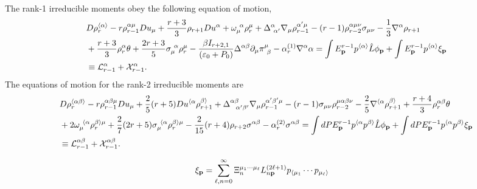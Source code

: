 \documentclass[aps,prd,preprint,nofootinbib,amsmath,amssymb,showpacs,longbibliography,singlecolumn,superscriptaddress,10pt]{revtex4-1}
\theoremstyle{plain}
\theoremstyle{definition}
\begin{document}
The rank-1 irreducible moments obey the following equation of motion,
%
\begin{equation}
\label{eq:transient-l=1}
\begin{aligned}
& 
D\rho _{r}^{\langle \alpha \rangle} 
-
r \rho^{ \alpha \mu}_{r-1} Du_{\mu}
+
\frac{r+3}{3}   \rho_{r+1} Du^{\alpha}
+
\omega_{\mu}^{\ \alpha} \rho^{\mu}_{r}
+
\Delta^{\alpha}_{ \ \alpha'} \nabla_{\mu} \rho_{r-1}^{\alpha' \mu} 
-
(r-1)  \rho^{\alpha \mu \nu}_{r-2} \sigma_{\mu \nu}
-
\frac{1}{3} \nabla^{\alpha}\rho_{r+1} 
\\
&
+
\frac{r+3}{3} \rho_{r}^{\alpha} \theta
+
\frac{2r+3}{5} \sigma_{\mu}^{\ \alpha}  \rho_{r}^{\mu}  
-
\frac{\beta I_{r+2,1}}{(\varepsilon_{0} + P_{0})}   \Delta^{\alpha \beta} \partial_{\mu}\pi^{\mu}_{ \ \beta}
-
\alpha_{r}^{(1)} \nabla^{\alpha}\alpha
=
\int E_{\mathbf{p}}^{r-1} p^{\langle \alpha \rangle} \Hat{L}\phi_{\mathbf{p}}
+
\int E_{\mathbf{p}}^{r-1} p^{\langle \alpha \rangle} \xi_{\mathbf{p}}
\\
&
\equiv
\mathcal{L}_{r-1}^{\alpha} + \mathcal{X}_{r-1}^{\alpha}.
\end{aligned}    
\end{equation}
%
The equations of motion for the rank-2 irreducible moments are
%
\begin{equation}
\label{eq:transient-l=2}
\begin{aligned}
&  D\rho ^{\langle \alpha \beta \rangle}_{r}
-
r \rho^{ \alpha \beta \mu}_{r-1} Du_{\mu}
+
\frac{2}{5} (r+5) Du^{ \langle \alpha}  \rho_{r+1}^{\beta\rangle} 
+\Delta^{\alpha \beta}_{ \ \ \alpha' \beta'}
 \nabla_{\mu} \rho_{r-1}^{\alpha' \beta' \mu} 
-
(r-1) \sigma_{\mu \nu} \rho^{\mu \alpha \beta \nu}_{r-2}
-
\frac{2}{5} 
 \nabla^{\langle \alpha} \rho_{r+1}^{\beta \rangle}
+
\frac{r+4}{3} \rho_{r}^{\alpha \beta} \theta 
\\
& 
+
2 
 \omega_{\mu}^{ \ \langle \alpha} \rho^{\beta \rangle \mu}_{r} 
+ \frac{2}{7} (2r+5)
\sigma_{\mu}^{\ \langle \alpha}  \rho_{r}^{\beta \rangle \mu}
-
\frac{2}{15} (r+4) \rho_{r+2} \sigma^{\alpha \beta}
-
\alpha_{r}^{(2)} 
 \sigma^{\alpha \beta}
=
\int dP E_{\mathbf{p}}^{r-1} p^{\langle \alpha} p^{\beta \rangle} \Hat{L} \phi_{\mathbf{p}}
+
\int dP E_{\mathbf{p}}^{r-1} p^{\langle \alpha} p^{\beta \rangle} \xi_{\mathbf{p}}
\\
&
\equiv
\mathcal{L}^{\alpha \beta}_{r-1}
+
\mathcal{X}^{\alpha \beta}_{r-1}.
\end{aligned}    
\end{equation}
%


\begin{equation}
\begin{aligned}
&
\xi_{\bf p} = \sum_{\ell, n = 0}^{\infty} \Xi_{n}^{\mu_{1} \cdots \mu_{\ell}} L^{(2 \ell + 1)}_{n {\bf p}} p_{\langle \mu_{1}} \cdots p_{\mu_{\ell} \rangle}
\end{aligned}    
\end{equation}
\end{document}
